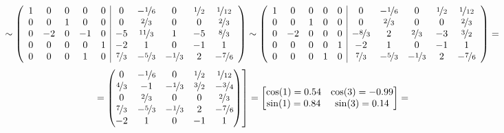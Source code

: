 \documentclass{article}
\begin{document}
$$\left.\sim \left(\begin{array}{ccccc|ccccc}
1 & 0 & 0 & 0 & 0 & 0 & -\nicefrac{1}{6} & 0 & \nicefrac{1}{2} & \nicefrac{1}{12}\\
0 & 0 & 1 & 0 & 0 & 0 & \nicefrac{2}{3} & 0 & 0 & \nicefrac{2}{3}\\
0 & -2 & 0 & -1 & 0 & -5 & \nicefrac{11}{3} & 1 & -5 & \nicefrac{8}{3}\\
0 & 0 & 0 & 0 & 1 & -2 & 1 & 0 & -1 & 1\\
0 & 0 & 0 & 1 & 0 & \nicefrac{7}{3} & -\nicefrac{5}{3} & -\nicefrac{1}{3} & 2 & -\nicefrac{7}{6}
\end{array}\right)\sim \left(\begin{array}{ccccc|ccccc}
1 & 0 & 0 & 0 & 0 & 0 & -\nicefrac{1}{6} & 0 & \nicefrac{1}{2} & \nicefrac{1}{12}\\
0 & 0 & 1 & 0 & 0 & 0 & \nicefrac{2}{3} & 0 & 0 & \nicefrac{2}{3}\\
0 & -2 & 0 & 0 & 0 & -\nicefrac{8}{3} & 2 & \nicefrac{2}{3} & -3 & \nicefrac{3}{2}\\
0 & 0 & 0 & 0 & 1 & -2 & 1 & 0 & -1 & 1\\
0 & 0 & 0 & 1 & 0 & \nicefrac{7}{3} & -\nicefrac{5}{3} & -\nicefrac{1}{3} & 2 & -\nicefrac{7}{6}
\end{array}\right) = \right.$$
$$\left. = \begin{pmatrix}
0 & -\nicefrac{1}{6} & 0 & \nicefrac{1}{2} & \nicefrac{1}{12}\\
\nicefrac{4}{3} & -1 & -\nicefrac{1}{3} & \nicefrac{3}{2} & -\nicefrac{3}{4}\\
0 & \nicefrac{2}{3} & 0 & 0 & \nicefrac{2}{3}\\
\nicefrac{7}{3} & -\nicefrac{5}{3} & -\nicefrac{1}{3} & 2 & -\nicefrac{7}{6} \\
-2 & 1 & 0 & -1 & 1
\end{pmatrix}\right] = \left[\begin{matrix}
\cos(1) = 0.54 & \cos(3) = -0.99 \\
\sin(1) = 0.84 & \sin(3) = 0.14
\end{matrix}\right] =$$
\end{document}

